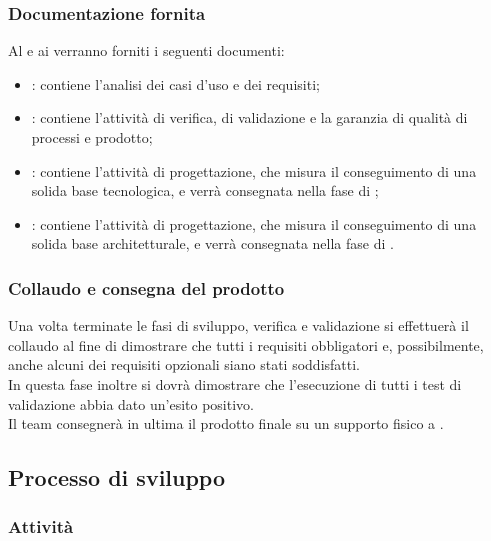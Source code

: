 \subsubsection{Documentazione fornita}
Al \proponente{} e ai \committenti{} verranno forniti i seguenti documenti:
\begin{itemize}
	\item \textbf{\AdR}: contiene l'analisi dei casi d'uso e dei requisiti;
	\item \textbf{\PdQ}: contiene l'attività di verifica, di validazione e la garanzia di qualità di processi e prodotto;
	\item \textbf{\ST}: contiene l'attività di progettazione, che misura il conseguimento di una solida base tecnologica, e verrà consegnata nella fase di \RP;
	\item \textbf{\DdP}: contiene l'attività di progettazione, che misura il conseguimento di una solida base architetturale, e verrà consegnata nella fase di \RQ.
\end{itemize}

\subsubsection{Collaudo e consegna del prodotto}
Una volta terminate le fasi di sviluppo, verifica e validazione si effettuerà il collaudo al fine di dimostrare che tutti i requisiti obbligatori e, possibilmente, anche alcuni dei requisiti opzionali siano stati soddisfatti. 
\\In questa fase inoltre si dovrà dimostrare che l'esecuzione di tutti i test di validazione abbia dato un'esito positivo.
\\Il team consegnerà in ultima il prodotto finale su un supporto fisico a \committenti.

\subsection{Processo di sviluppo}
\subsubsection{Attività}
